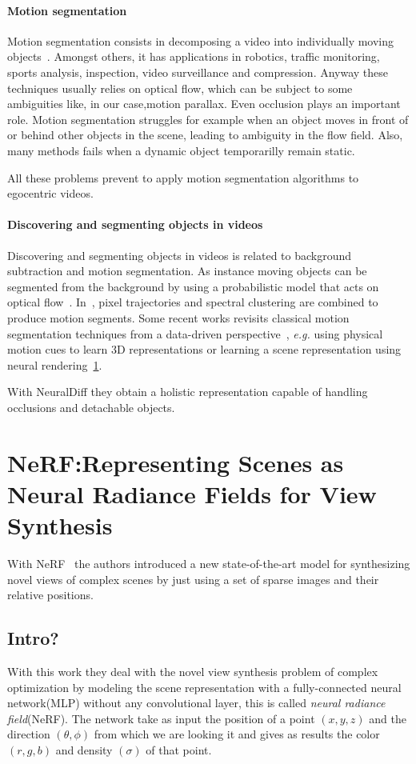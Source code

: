 \paragraph{Motion segmentation}
Motion segmentation consists in decomposing a video into individually moving 
objects~\cite{ndiff_18}. Amongst others, it has applications in 
robotics, traffic monitoring, sports analysis, inspection, video surveillance and compression.
Anyway these techniques usually relies on optical flow, which can be subject to some ambiguities
like, in our case,motion parallax. Even occlusion plays an important role. Motion segmentation
struggles for example when an object moves in front of or behind other objects in the 
scene, leading to ambiguity in the flow field. Also, many methods fails when a dynamic 
object temporarilly remain static.

All these problems prevent to apply motion segmentation algorithms to egocentric videos.

\paragraph{Discovering and segmenting objects in videos}
Discovering and segmenting objects in videos is related to background subtraction and 
motion segmentation.
As instance moving objects can be segmented from the background by using a probabilistic model
that acts on optical flow~\cite{ndiff_1}. In~\cite{ndiff_3}, pixel trajectories and
spectral clustering are combined to produce motion segments. Some recent works revisits classical motion segmentation
techniques from a data-driven perspective~\cite{ndiff_38}, \textit{e.g.} using 
physical motion cues to learn 3D representations or learning a scene representation
using neural rendering~\ref{sec:nerf}. 

With NeuralDiff they obtain a holistic representation capable of handling occlusions
and detachable objects.


\section{NeRF:Representing Scenes as Neural Radiance Fields for View Synthesis}\label{sec:nerf}
With NeRF~\cite{nerf} the authors introduced a new state-of-the-art model
for synthesizing novel views of complex scenes by just using a set of sparse
images and their relative positions.
\subsection{Intro?}
With this work they deal with the novel view synthesis problem of complex optimization
by modeling the scene representation with a fully-connected neural network(MLP) without any
convolutional layer, this is called \textit{neural radiance field}(NeRF). The network
take as input the position of a point $(x,y,z)$ and the direction $(\theta,\phi)$ from which we are looking it
and gives as results the color$(r,g,b)$ and density $(\sigma)$ of that point. 

